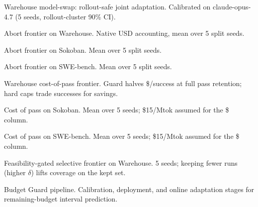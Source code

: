 \caption{Warehouse model-swap: rollout-safe joint adaptation.
Calibrated on claude-opus-4.7 (5 seeds, rollout-cluster 90\% CI).}

\caption{Abort frontier on Warehouse.
Native USD accounting, mean over 5 split seeds.}

\caption{Abort frontier on Sokoban.
Mean over 5 split seeds.}

\caption{Abort frontier on SWE-bench.
Mean over 5 split seeds.}

\caption{Warehouse cost-of-pass frontier.
Guard halves \$/success at full pass retention; hard caps trade successes for savings.}

\caption{Cost of pass on Sokoban.
Mean over 5 seeds; \$15/Mtok assumed for the \$ column.}

\caption{Cost of pass on SWE-bench.
Mean over 5 seeds; \$15/Mtok assumed for the \$ column.}

\caption{Feasibility-gated selective frontier on Warehouse.
5 seeds; keeping fewer runs (higher $\delta$) lifts coverage on the kept set.}

\caption{Budget Guard pipeline.
Calibration, deployment, and online adaptation stages for remaining-budget interval prediction.}
